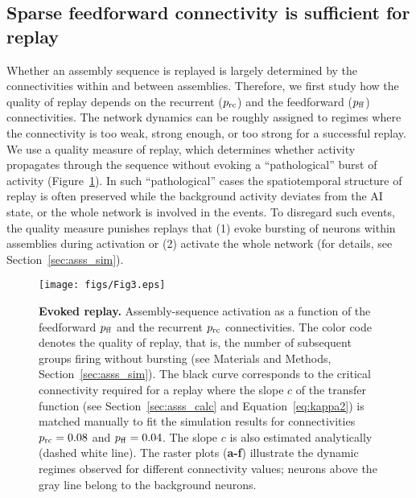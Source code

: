  \subsection{Sparse feedforward connectivity is sufficient for replay}
    Whether an assembly sequence is replayed is largely determined by the
    connectivities within and between assemblies. Therefore, we first study how
    the quality of replay depends on the recurrent ($p_{\rm rc}$) and the
    feedforward ($p_{\rm ff}$) connectivities. The network dynamics can be
    roughly assigned to regimes where the connectivity is too weak, strong
    enough, or too strong for a successful replay. We use a quality measure of
    replay, which determines whether activity propagates through the sequence
    without evoking a ``pathological'' burst of activity (Figure~\ref{fig3}). In
    such ``pathological'' cases the spatiotemporal structure of replay is often
    preserved while the background activity deviates from the AI state, or the
    whole network is involved in the events. To disregard such events, the
    quality measure punishes replays that (1) evoke bursting of neurons within
    assemblies during activation or (2) activate the whole network (for details,
    see Section~\ref{sec:asss_sim}).

    \begin{figure}[!h]
      \center
      \texttt{[image: figs/Fig3.eps]}
      \caption{{\bf Evoked replay.}
        Assembly-sequence activation as a function of the feedforward $p_{\rm
        ff}$ and the recurrent $p_{\rm rc}$ connectivities. The color code
        denotes the quality of replay, that is, the number of subsequent groups
        firing without bursting (see Materials and Methods,
        Section~\ref{sec:asss_sim}). The black curve corresponds to the
        critical connectivity required for a replay where the slope $c$ of the
        transfer function (see Section~\ref{sec:asss_calc} and
        Equation~\ref{eq:kappa2}) is matched manually to fit the simulation
        results for connectivities $p_{\rm rc}=0.08$ and $p_{\rm ff}=0.04$. The
        slope $c$ is also estimated analytically (dashed white line). The
        raster plots (\textbf{a-f}) illustrate the dynamic regimes observed for
        different connectivity values; neurons above the gray line belong to
        the background neurons.
      }
      \label{fig3}
    \end{figure}

